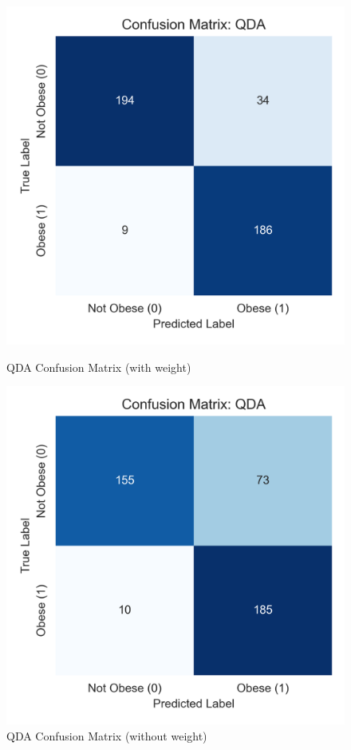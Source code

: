 \documentclass[a4paper,12pt]{article}
\begin{document}
\begin{figure}[H]
\centering
\begin{minipage}{0.35\textwidth}
    \centering
    \includegraphics[width=\linewidth]{qda_confusion.png}
    \caption{QDA Confusion Matrix (with weight)}
\end{minipage}
\hspace{0.04\textwidth}
\begin{minipage}{0.35\textwidth}
    \centering
    \includegraphics[width=\linewidth]{qda_confusion_withoutWeight.png}
    \caption{QDA Confusion Matrix (without weight)}
\end{minipage}
\label{fig:qda_weight_comparison}
\end{figure}
\end{document}

